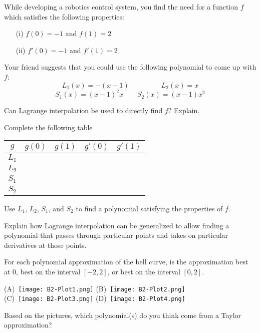 \documentclass{workbook}
\begin{document}
\begin{slide}
	\question
		While developing a robotics control system, you find the need for
		a function $f$ which satisfies the following properties:
	\begin{enumerate}
		\item[(i)] $f(0)=-1$ and $f(1)=2$
		\item[(ii)] $f'(0)=-1$ and $f'(1)=2$
	\end{enumerate}
	Your friend suggests that you could use the following polynomial to come up with $f$:
	\[
		L_1(x)=-(x-1) \qquad\phantom{x}\qquad L_2(x)=x
	\]
	\[
		S_1(x)=(x-1)^2x \qquad S_2(x)=(x-1)x^2
	\]

	\begin{parts}
		\item Can Lagrange interpolation be used to directly find $f$? Explain.
		\item Complete the following table
		\begin{center}
		\begin{tabular}{|c|c|c|c|c|}
			\hline
			$g$ & $g(0)$ & $g(1)$ & $g'(0)$ & $g'(1)$\\
			\hline
			$L_1$ & & & & \\
			\hline
			$L_2$ & & & & \\
			\hline
			$S_1$ & & & & \\
			\hline
			$S_2$ & & & & \\
			\hline
		\end{tabular}
		\end{center}
		\item Use $L_1$, $L_2$, $S_1$, and $S_2$ to find a polynomial satisfying the properties of $f$.
		\item Explain how Lagrange interpolation can be generalized to allow finding a polynomial
		that passes through particular points and takes on particular derivatives at those points.
	\end{parts}
\end{slide}

\begin{slide}
	\question
	\begin{parts}
	\item For each polynomial approximation of the bell curve, is the approximation best at
	$0$, best on the interval $[-2,2]$, or best on the interval $[0,2]$.

	(A)~\texttt{[image: B2-Plot1.png]}
	(B)~\texttt{[image: B2-Plot2.png]}\\
	(C)~\texttt{[image: B2-Plot3.png]}
	(D)~\texttt{[image: B2-Plot4.png]}
	\item Based on the pictures, which polynomial(s) do you think come from a Taylor approximation?
	\end{parts}
\end{slide}
\end{document}
